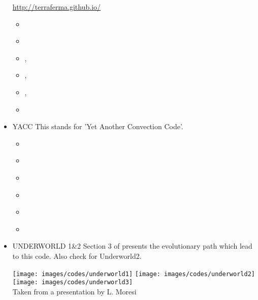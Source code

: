 \begin{itemize}
\url{http://terraferma.github.io/}

\begin{scriptsize}
\begin{itemize}
\item[\twothousandfourteen]  \textcite{wisv14}
\item[\twothousandsixteen]   \textcite{spmw16}
\item[\twothousandseventeen] \textcite{wisv17}, \textcite{ceww17}
\item[\twothousandnineteen]  \textcite{ceww19}, \textcite{perr19}
\item[\twothousandtwenty]    \textcite{siss20}, \textcite{abvw20}
\item[\twothousandtwentytwo] \textcite{ceap22}
\end{itemize}
\end{scriptsize}

\item {\codefont YACC} 
This stands for 'Yet Another Convection Code'.

\begin{scriptsize}
\begin{itemize}
\item[\twothousandten]       \textcite{toyc10}
\item[\twothousandeleven]    \textcite{yutc11}
\item[\twothousandtwelve]    \textcite{sato12}
\item[\twothousandthirteen]  \textcite{toyd13}
\item[\twothousandfifteen]   \textcite{tosn15}
\item[\twothousandsixteen]   \textcite{tomy16}
\end{itemize}
\end{scriptsize}

\item {\codefont UNDERWORLD 1\&2} 
Section 3 of \cite{qums07} presents the evolutionary path which lead to this code.
Also check \cite{magm20} for Underworld2. 

\begin{center}
\texttt{[image: images/codes/underworld1]}
\texttt{[image: images/codes/underworld2]}
\texttt{[image: images/codes/underworld3]}\\
{\captionfont Taken from a presentation by L. Moresi}
\end{center}



\end{itemize}
